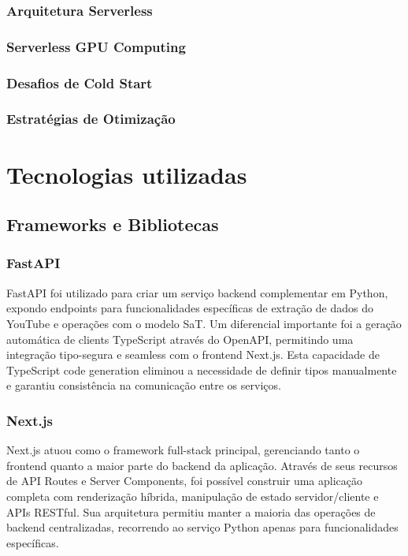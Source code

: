 \documentclass[tcc,capa]{texufpel}
\begin{document}
\subsection{Arquitetura Serverless}
\subsection{Serverless GPU Computing}
\subsection{Desafios de Cold Start}
\subsection{Estratégias de Otimização}






\chapter{Tecnologias utilizadas}

\section{Frameworks e Bibliotecas}

\subsection{FastAPI}
FastAPI foi utilizado para criar um serviço backend complementar em Python, expondo endpoints para funcionalidades específicas de extração de dados do YouTube e operações com o modelo SaT. Um diferencial importante foi a geração automática de clients TypeScript através do OpenAPI, permitindo uma integração tipo-segura e seamless com o frontend Next.js. Esta capacidade de TypeScript code generation eliminou a necessidade de definir tipos manualmente e garantiu consistência na comunicação entre os serviços.

\subsection{Next.js}
Next.js atuou como o framework full-stack principal, gerenciando tanto o frontend quanto a maior parte do backend da aplicação. Através de seus recursos de API Routes e Server Components, foi possível construir uma aplicação completa com renderização híbrida, manipulação de estado servidor/cliente e APIs RESTful. Sua arquitetura permitiu manter a maioria das operações de backend centralizadas, recorrendo ao serviço Python apenas para funcionalidades específicas.
\end{document}

